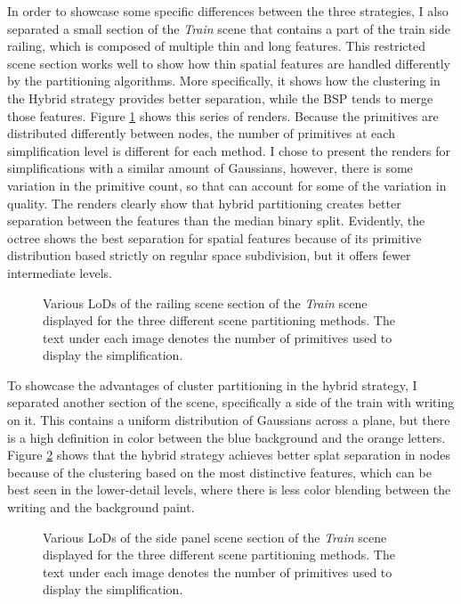 In order to showcase some specific differences between the three strategies, I also separated a small section of the \textit{Train} scene that contains a part of the train side railing, which is composed of multiple thin and long features. This restricted scene section works well to show how thin spatial features are handled differently by the partitioning algorithms. More specifically, it shows how the clustering in the Hybrid strategy provides better separation, while the BSP tends to merge those features. Figure \ref{fig:railing} shows this series of renders. Because the primitives are distributed differently between nodes, the number of primitives at each simplification level is different for each method. I chose to present the renders for simplifications with a similar amount of Gaussians, however, there is some variation in the primitive count, so that can account for some of the variation in quality. The renders clearly show that hybrid partitioning creates better separation between the features than the median binary split. Evidently, the octree shows the best separation for spatial features because of its primitive distribution based strictly on regular space subdivision, but it offers fewer intermediate levels.

\begin{figure}[H]
    \centering
    
    \caption{Various LoDs of the railing scene section of the \textit{Train} scene displayed for the three different scene partitioning methods. The text under each image denotes the number of primitives used to display the simplification.}
    \label{fig:railing}
\end{figure}

To showcase the advantages of cluster partitioning in the hybrid strategy, I separated another section of the scene, specifically a side of the train with writing on it. This contains a uniform distribution of Gaussians across a plane, but there is a high definition in color between the blue background and the orange letters. Figure \ref{fig:panellod} shows that the hybrid strategy achieves better splat separation in nodes because of the clustering based on the most distinctive features, which can be best seen in the lower-detail levels, where there is less color blending between the writing and the background paint.

\begin{figure}[H]
    \centering
    
    \caption{Various LoDs of the side panel scene section of the \textit{Train} scene displayed for the three different scene partitioning methods. The text under each image denotes the number of primitives used to display the simplification.}
    \label{fig:panellod}
\end{figure}

